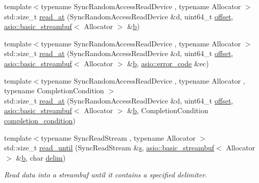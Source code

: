 \begin{DoxyCompactItemize}
\item 
{\footnotesize template$<$typename Sync\+Random\+Access\+Read\+Device , typename Allocator $>$ }\\std\+::size\+\_\+t \hyperlink{group__read__at_ga301406c670bc22190df6e8628cbf0037}{read\+\_\+at} (Sync\+Random\+Access\+Read\+Device \&d, uint64\+\_\+t \hyperlink{group__async__read__at_ga8dcdb41a4adfd6fe5322b5dd666d9f29}{offset}, \hyperlink{classasio_1_1basic__streambuf}{asio\+::basic\+\_\+streambuf}$<$ Allocator $>$ \&\hyperlink{group__async__read_ga945a5c18fa77a9e2eba420f8f44b2a4f}{b})
\item 
{\footnotesize template$<$typename Sync\+Random\+Access\+Read\+Device , typename Allocator $>$ }\\std\+::size\+\_\+t \hyperlink{group__read__at_ga4511bad893697fc58d379d6e00aa84ff}{read\+\_\+at} (Sync\+Random\+Access\+Read\+Device \&d, uint64\+\_\+t \hyperlink{group__async__read__at_ga8dcdb41a4adfd6fe5322b5dd666d9f29}{offset}, \hyperlink{classasio_1_1basic__streambuf}{asio\+::basic\+\_\+streambuf}$<$ Allocator $>$ \&\hyperlink{group__async__read_ga945a5c18fa77a9e2eba420f8f44b2a4f}{b}, \hyperlink{classasio_1_1error__code}{asio\+::error\+\_\+code} \&ec)
\item 
{\footnotesize template$<$typename Sync\+Random\+Access\+Read\+Device , typename Allocator , typename Completion\+Condition $>$ }\\std\+::size\+\_\+t \hyperlink{group__read__at_ga0126c00568f324b47c24b494c97ece14}{read\+\_\+at} (Sync\+Random\+Access\+Read\+Device \&d, uint64\+\_\+t \hyperlink{group__async__read__at_ga8dcdb41a4adfd6fe5322b5dd666d9f29}{offset}, \hyperlink{classasio_1_1basic__streambuf}{asio\+::basic\+\_\+streambuf}$<$ Allocator $>$ \&\hyperlink{group__async__read_ga945a5c18fa77a9e2eba420f8f44b2a4f}{b}, Completion\+Condition \hyperlink{group__async__read_gae2e215d5013596cc2b385bb6c13fa518}{completion\+\_\+condition})
\item 
{\footnotesize template$<$typename Sync\+Read\+Stream , typename Allocator $>$ }\\std\+::size\+\_\+t \hyperlink{group__read__until_ga1aae2baa82596a6a9ad320e80b016006}{read\+\_\+until} (Sync\+Read\+Stream \&\hyperlink{group__async__connect_ga31ab74b9ea6c77932dddd016cfc7920a}{s}, \hyperlink{classasio_1_1basic__streambuf}{asio\+::basic\+\_\+streambuf}$<$ Allocator $>$ \&\hyperlink{group__async__read_ga945a5c18fa77a9e2eba420f8f44b2a4f}{b}, char \hyperlink{group__async__read__until_gafbf62a75ad736aff941c1f70d4b3c223}{delim})
\begin{DoxyCompactList}\small\item\em Read data into a streambuf until it contains a specified delimiter. \end{DoxyCompactList}\item 

\end{DoxyCompactItemize}
